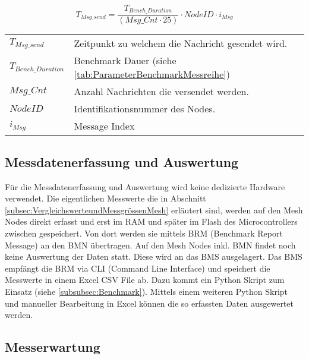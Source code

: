 \begin{equation}\label{eq:TrafficGenerationSeq}
T_{Msg\_send} =  \frac{T_{Bench\_Duration}}{(Msg\_Cnt \cdot 25)} \cdot NodeID \cdot i_{Msg}
\end{equation}

\begin{small}
\begin{center}
\begin{tabular}{ll}
$T_{Msg\_send}$ & Zeitpunkt zu welchem die Nachricht gesendet wird.\\
$T_{Bench\_Duration}$ & Benchmark Dauer (siehe \ref{tab:ParameterBenchmarkMessreihe})\\
$Msg\_Cnt$ & Anzahl Nachrichten die versendet werden.\\
$NodeID$ &Identifikationsnummer des Nodes. \\
$i_{Msg}$ & Message Index
\end{tabular}
\end{center}
\end{small}


\subsection{Messdatenerfassung und Auswertung}\label{subsec:MessdatenerfassungundAuswertung}

Für die Messdatenerfassung und Auswertung wird keine dedizierte Hardware verwendet. Die eigentlichen Messwerte die in Abschnitt \ref{subsec:VergleichswerteundMessgrössenMesh} erläutert sind, werden auf den Mesh Nodes direkt erfasst und erst im RAM und später im Flash des Microcontrollers zwischen gespeichert. Von dort werden sie mittels BRM (Benchmark Report Message) an den BMN übertragen.
Auf den Mesh Nodes inkl. BMN findet noch keine Auswertung der Daten statt.
Diese wird an das BMS ausgelagert.
Das BMS empfängt die BRM via CLI (Command Line Interface) und speichert die Messwerte in einem Excel CSV File ab. Dazu kommt ein Python Skript zum Einsatz (siehe \ref{subsubsec:Benchmark}).
Mittels einem weiteren Python Skript und manueller Bearbeitung in Excel können die so erfassten Daten ausgewertet werden.

\subsection{Messerwartung}\label{subsec:Messerwartung}

